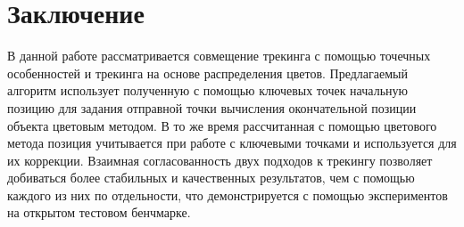 \section{Заключение}


В данной работе рассматривается совмещение трекинга с помощью точечных
особенностей и трекинга на основе распределения цветов.
Предлагаемый алгоритм использует полученную с помощью ключевых точек начальную
позицию для задания отправной точки вычисления окончательной позиции объекта
цветовым методом.
В то же время рассчитанная с помощью цветового метода позиция учитывается при
работе с ключевыми точками и используется для их коррекции.
Взаимная согласованность двух подходов к трекингу позволяет добиваться более
стабильных и качественных результатов, чем с помощью каждого из них по
отдельности, что демонстрируется с помощью экспериментов на открытом тестовом
бенчмарке.

